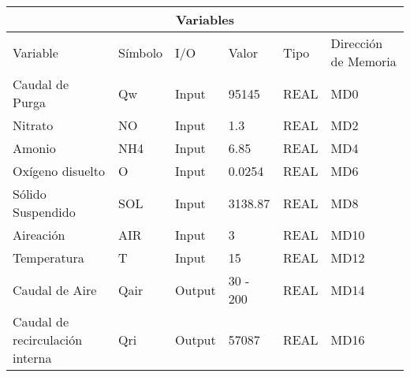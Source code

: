 \documentclass{article}
\begin{document}
\begin{tabular}{ |p{3cm}|p{2cm}|p{2cm}|p{2cm}|p{2cm}|p{2cm}|  }
 \hline
 \multicolumn{6}{|c|}{Variables} \\
 \hline
 Variable &Símbolo &I/O &Valor &Tipo &Dirección de Memoria\\
 \hline
 Caudal de Purga   & Qw &Input &95145 &REAL &MD0\\
 Nitrato&   NO  & Input   &1.3 &REAL &MD2\\
 Amonio &NH4 &Input &6.85 &REAL &MD4\\
 Oxígeno disuelto &O &Input &0.0254 &REAL &MD6\\
 Sólido Suspendido &SOL &Input &3138.87 &REAL &MD8\\
 Aireación &AIR &Input &3 &REAL &MD10\\
 Temperatura &T &Input &15 &REAL &MD12\\
 Caudal de Aire &Qair &Output &30 - 200 &REAL &MD14\\
 Caudal de recirculación interna &Qri &Output &57087 &REAL &MD16\\
 \hline
\end{tabular}
\end{document}
